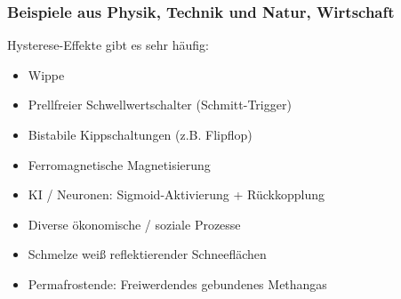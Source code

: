 \documentclass{beamer}
\begin{document}
\begin{frame}[t]
  \frametitle{Beispiele aus Physik, Technik und Natur, Wirtschaft}
  Hysterese-Effekte gibt es sehr häufig:
  \begin{itemize}
    \item<2->  Wippe
    \item<3->  Prellfreier Schwellwertschalter (Schmitt-Trigger)
    \item<4->  Bistabile Kippschaltungen (z.B. Flipflop)
    \item<5->  Ferromagnetische Magnetisierung
    \item<6->  KI / Neuronen: Sigmoid-Aktivierung + Rückkopplung
    \item<7->  Diverse ökonomische / soziale Prozesse
    \item<8->  Schmelze weiß reflektierender Schneeflächen
    \item<9->  Permafrostende: Freiwerdendes gebundenes Methangas
  \end{itemize}
\end{frame}

\end{document}
